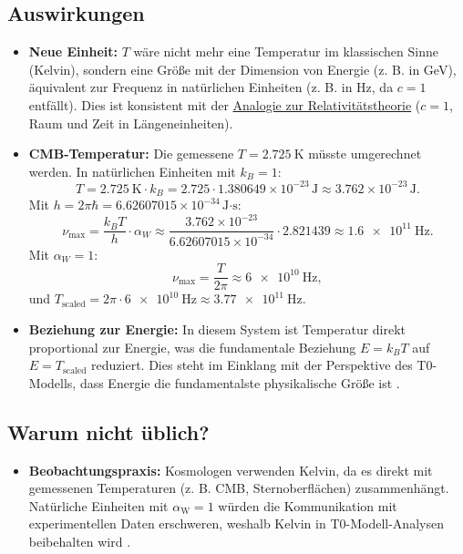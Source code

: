 \documentclass[12pt,a4paper]{article}
\newcommand{\alphaW}{\alpha_{\text{W}}}
\begin{document}
\subsection{Auswirkungen}
\begin{tcolorbox}[
	colback=blue!5!white,
	colframe=blue!75!black,
	title={Auswirkungen von \(\alpha_W = 1\)} %
	]
	\begin{itemize}
		\item \textbf{Neue Einheit:} \(T\) wäre nicht mehr eine Temperatur im klassischen Sinne (Kelvin), sondern eine Größe mit der Dimension von Energie (z. B. in GeV), äquivalent zur Frequenz in natürlichen Einheiten (z. B. in Hz, da \(c = 1\) entfällt). Dies ist konsistent mit der \href{https://github.com/jpascher/T0-Time-Mass-Duality/tree/main/2/pdf/Deutsch/ZeitRaumPascher.pdf}{Analogie zur Relativitätstheorie} (\(c = 1\), Raum und Zeit in Längeneinheiten).
		\item \textbf{CMB-Temperatur:} Die gemessene \(T = \SI{2.725}{\kelvin}\) müsste umgerechnet werden. In natürlichen Einheiten mit \(k_B = 1\):
		\[
		T = \SI{2.725}{\kelvin} \cdot k_B = 2.725 \cdot 1.380649 \times 10^{-23} \, \text{J} \approx 3.762 \times 10^{-23} \, \text{J}.
		\]
		Mit \(h = 2\pi \hbar = 6.62607015 \times 10^{-34} \, \text{J·s}\):
		\[
		\nu_{\text{max}} = \frac{k_B T}{h} \cdot \alpha_W \approx \frac{3.762 \times 10^{-23}}{6.62607015 \times 10^{-34}} \cdot 2.821439 \approx \SI{1.6e11}{\hertz}.
		\]
		Mit \(\alpha_W = 1\):
		\[
		\nu_{\text{max}} = \frac{T}{2\pi} \approx \SI{6e10}{\hertz},
		\]
		und \(T_{\text{scaled}} = 2\pi \cdot \SI{6e10}{\hertz} \approx \SI{3.77e11}{\hertz}\).
		\item \textbf{Beziehung zur Energie:} In diesem System ist Temperatur direkt proportional zur Energie, was die fundamentale Beziehung \(E = k_B T\) auf \(E = T_{\text{scaled}}\) reduziert. Dies steht im Einklang mit der Perspektive des T0-Modells, dass Energie die fundamentalste physikalische Größe ist \cite{pascher_alpha_2025}.
	\end{itemize}
\end{tcolorbox}
	
	\subsection{Warum nicht üblich?}
	
	\begin{itemize}
		\item \textbf{Beobachtungspraxis:} Kosmologen verwenden Kelvin, da es direkt mit gemessenen Temperaturen (z. B. CMB, Sternoberflächen) zusammenhängt. Natürliche Einheiten mit \(\alphaW = 1\) würden die Kommunikation mit experimentellen Daten erschweren, weshalb Kelvin in T0-Modell-Analysen beibehalten wird \cite{pascher_messdifferenzen_2025}.
	\end{itemize}
	
\end{document}
